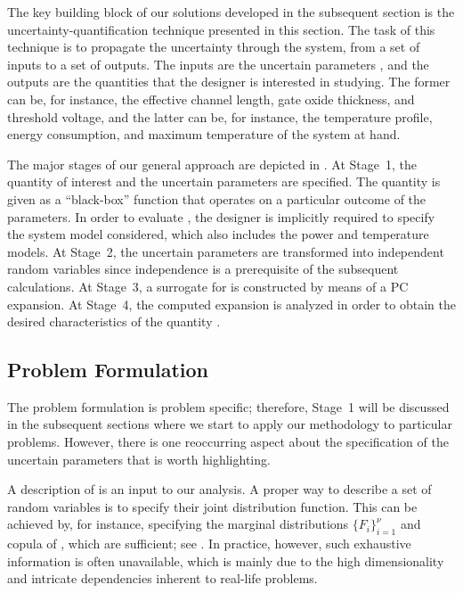 The key building block of our solutions developed in the subsequent section is
the uncertainty-quantification technique presented in this section. The task of
this technique is to propagate the uncertainty through the system, from a set of
inputs to a set of outputs. The inputs are the uncertain parameters \vu, and the
outputs are the quantities that the designer is interested in studying. The
former can be, for instance, the effective channel length, gate oxide thickness,
and threshold voltage, and the latter can be, for instance, the temperature
profile, energy consumption, and maximum temperature of the system at hand.

The major stages of our general approach are depicted in .
At Stage~1, the quantity of interest \g and the uncertain parameters \vu are
specified. The quantity is given as a ``black-box'' function that operates on a
particular outcome of the parameters. In order to evaluate \g, the designer is
implicitly required to specify the system model considered, which also includes
the power and temperature models. At Stage~2, the uncertain parameters \vu are
transformed into independent random variables \vz since independence is a
prerequisite of the subsequent calculations. At Stage~3, a surrogate for \g is
constructed by means of a \ac{PC} expansion. At Stage~4, the computed expansion
is analyzed in order to obtain the desired characteristics of the quantity \g.

\subsection{Problem Formulation}

The problem formulation is problem specific; therefore, Stage~1 will be
discussed in the subsequent sections where we start to apply our methodology to
particular problems. However, there is one reoccurring aspect about the
specification of the uncertain parameters \vu that is worth highlighting.

A description of \vu is an input to our analysis. A proper way to describe a set
of random variables is to specify their joint distribution function. This can be
achieved by, for instance, specifying the marginal distributions $\{ F_i \}_{i =
1}^\nu$ and copula \cite{nelsen2006} of \vu, which are sufficient; see
. In practice, however, such exhaustive information is
often unavailable, which is mainly due to the high dimensionality and intricate
dependencies inherent to real-life problems.

